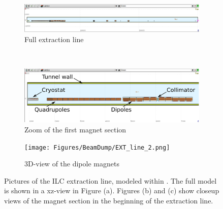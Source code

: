 \begin{figure}[h]
 \centering
  \begin{subfigure}[b]{\textwidth}
   \centering
    \includegraphics[width=\textwidth]{Figures/BeamDump/EXT_line.png}
   \caption{Full extraction line}
   \end{subfigure}\\
   \begin{subfigure}[b]{0.63\textwidth}
   \centering
    \includegraphics[width=\textwidth]{Figures/BeamDump/EXT_line_1.png}
   \caption{Zoom of the first magnet section}
   \end{subfigure}
   \hfill
    \begin{subfigure}[b]{0.35\textwidth}
   \centering
    \texttt{[image: Figures/BeamDump/EXT\_line\_2.png]}
   \caption{3D-view of the dipole magnets}
   \end{subfigure}
   \caption[\fluka model of the ILC extraction line]{Pictures of the ILC extraction line, modeled within \flair.
   The full model is shown in a xz-view in Figure (a).
   Figures (b) and (c) show closeup views of the magnet section in the beginning of the extraction line.}
   \label{fig:BeamDumps:EXT}
\end{figure} 

